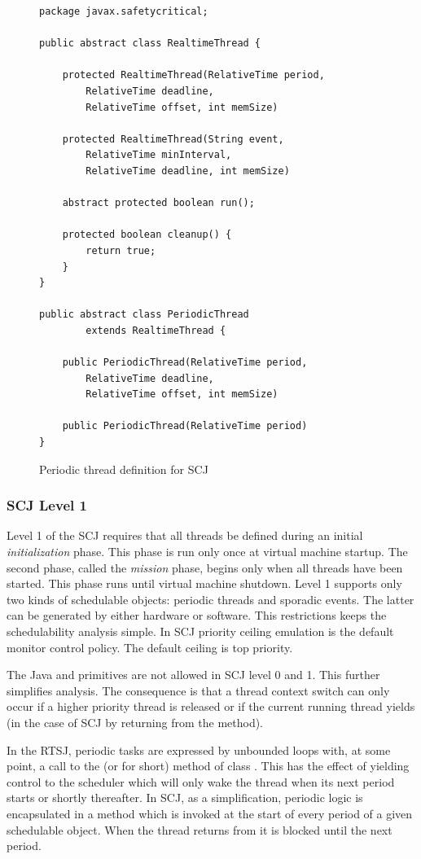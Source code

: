 \begin{figure}[t!]
{\small
\begin{verbatim}
package javax.safetycritical;

public abstract class RealtimeThread {

    protected RealtimeThread(RelativeTime period,
        RelativeTime deadline,
        RelativeTime offset, int memSize)

    protected RealtimeThread(String event,
        RelativeTime minInterval,
        RelativeTime deadline, int memSize)

    abstract protected boolean run();

    protected boolean cleanup() {
        return true;
    }
}

public abstract class PeriodicThread
        extends RealtimeThread {

    public PeriodicThread(RelativeTime period,
        RelativeTime deadline,
        RelativeTime offset, int memSize)

    public PeriodicThread(RelativeTime period)
}
\end{verbatim} }
\caption{Periodic thread definition for SCJ}\label{lst:scjdef}
\end{figure}

\subsubsection{SCJ Level 1}

Level 1 of the SCJ requires that all threads be defined during an
initial \emph{initialization} phase. This phase is run only once at
virtual machine startup. The second phase, called the \emph{mission}
phase, begins only when all threads have been started. This phase
runs until virtual machine shutdown. Level 1 supports only two kinds
of schedulable objects: periodic threads and sporadic events. The
latter can be generated by either hardware or software. This
restrictions keeps the schedulability analysis simple. In SCJ
priority ceiling emulation is the default monitor control policy.
The default ceiling is top priority.

The Java  and  primitives are not allowed in
SCJ level 0 and 1. This further simplifies analysis. The consequence
is that a thread context switch can only occur if a higher priority
thread is released or if the current running thread yields (in the
case of SCJ by returning from the  method).

In the RTSJ, periodic tasks are expressed by unbounded loops with,
at some point, a call to the  (or
 for short) method of class . This
has the effect of yielding control to the scheduler which will only
wake the thread when its next period starts or shortly thereafter.
In SCJ, as a simplification, periodic logic is encapsulated in a
 method which is invoked at the start of every period of
a given schedulable object. When the thread returns from
 it is blocked until the next period.


